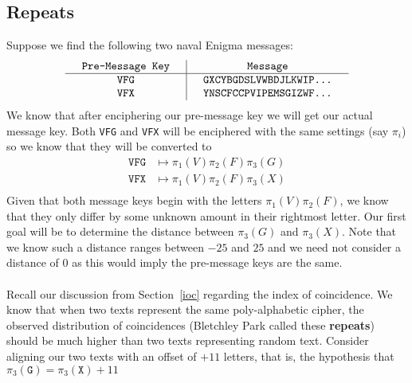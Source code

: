 \subsection{Repeats}
Suppose we find the following two naval Enigma messages:
\[
  \setlength{\arraycolsep}{15pt}
  \begin{array}{c | c}
    \texttt{Pre-Message Key} & \texttt{Message}                \\
    \hline
    \texttt{VFG}             & \texttt{GXCYBGDSLVWBDJLKWIP...} \\
    \texttt{VFX}             & \texttt{YNSCFCCPVIPEMSGIZWF...} \\
  \end{array}
\]
We know that after enciphering our pre-message key we will get our
actual message key. Both \texttt{VFG} and \texttt{VFX} will be
enciphered with the same settings (say $\pi_i$) so we know that
they will be converted to
\begin{align*}
  \texttt{VFG} & \mapsto \pi_1(V)\pi_2(F)\pi_3(G) \\
  \texttt{VFX} & \mapsto \pi_1(V)\pi_2(F)\pi_3(X) \\
\end{align*}
Given that both message keys begin with the letters
$\pi_1(V)\pi_2(F)$, we know that they only differ by some
unknown amount in their rightmost letter. Our first goal will be to
determine the distance between $\pi_3(G)$ and $\pi_3(X)$.
Note that we know such a distance ranges between $-25$ and $25$ and
we need not consider a distance of $0$ as this would imply the
pre-message keys are the same.
\\\\Recall our discussion from Section~\ref{ioc} regarding the
index of coincidence. We know that when two texts represent the
same poly-alphabetic cipher, the observed distribution of coincidences
(Bletchley Park called these {\bf{repeats}}) should be much higher
than two texts representing random text. Consider aligning our two
texts with an offset of $+11$ letters, that is, the hypothesis that
$\pi_3(\texttt{G}) = \pi_3(\texttt{X}) + 11$
\begin{center}
\end{center}
